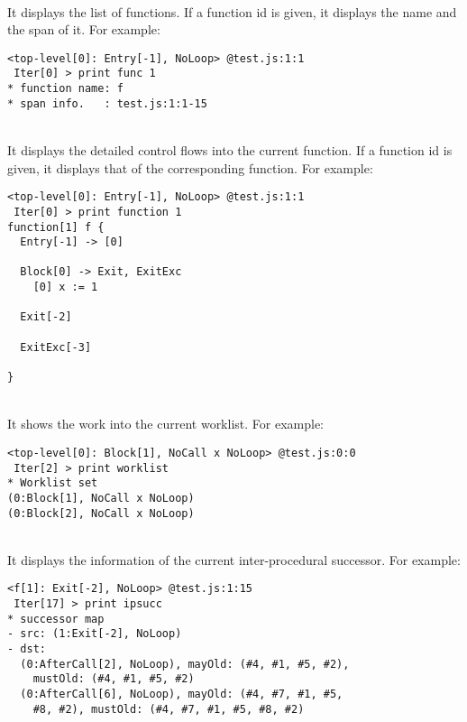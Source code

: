 \medskip\noindent
{}\\[.2em]
It displays the list of functions.
If a function id is given, it displays the name and the span of it.
For example:
{\small
\begin{verbatim}
<top-level[0]: Entry[-1], NoLoop> @test.js:1:1
 Iter[0] > print func 1
* function name: f
* span info.   : test.js:1:1-15
\end{verbatim}
}

\medskip\noindent
{}\\[.2em]
It displays the detailed control flows into the current function.
If a function id is given, it displays that of the corresponding function.
For example:
{\small
\begin{verbatim}
<top-level[0]: Entry[-1], NoLoop> @test.js:1:1
 Iter[0] > print function 1
function[1] f {
  Entry[-1] -> [0]

  Block[0] -> Exit, ExitExc
    [0] x := 1

  Exit[-2]

  ExitExc[-3]

}
\end{verbatim}
}

\medskip\noindent
{}\\[.2em]
It shows the work into the current worklist.  For example:
{\small
\begin{verbatim}
<top-level[0]: Block[1], NoCall x NoLoop> @test.js:0:0
 Iter[2] > print worklist
* Worklist set
(0:Block[1], NoCall x NoLoop)
(0:Block[2], NoCall x NoLoop)
\end{verbatim}
}

\medskip\noindent
{}\\[.2em]
It displays the information of the current inter-procedural successor.
For example:
{\small
\begin{verbatim}
<f[1]: Exit[-2], NoLoop> @test.js:1:15
 Iter[17] > print ipsucc
* successor map
- src: (1:Exit[-2], NoLoop)
- dst:
  (0:AfterCall[2], NoLoop), mayOld: (#4, #1, #5, #2),
    mustOld: (#4, #1, #5, #2)
  (0:AfterCall[6], NoLoop), mayOld: (#4, #7, #1, #5,
    #8, #2), mustOld: (#4, #7, #1, #5, #8, #2)
\end{verbatim}
}

